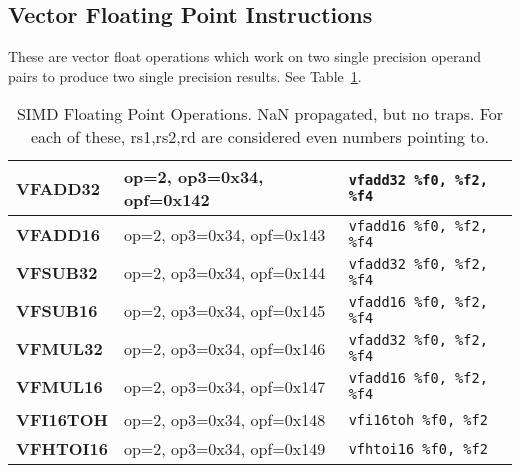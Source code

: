 \subsection{Vector Floating Point Instructions}
\label{sec:vector-floating-point-instructions}

These are vector  float operations which work on  two single precision
operand  pairs   to  produce   two  single  precision   results.   See
Table~\ref{tab:simd:float:ops}.

\begin{table}[p]
  \centering
  \begin{tabular}[p]{|l|l|l|}
    \hline
    \textbf{VFADD32}
    & {op=2, op3=0x34, opf=0x142}
    & \texttt{vfadd32 \%f0, \%f2, \%f4} \\
    \hline
    \textbf{VFADD16}
    & {op=2, op3=0x34, opf=0x143}
    & \texttt{vfadd16 \%f0, \%f2, \%f4} \\
    \hline
    \textbf{VFSUB32}
    & {op=2, op3=0x34, opf=0x144}
    & \texttt{vfadd32 \%f0, \%f2, \%f4} \\
    \hline
    \textbf{VFSUB16}
    & {op=2, op3=0x34, opf=0x145}
    & \texttt{vfadd16 \%f0, \%f2, \%f4} \\
    \hline
    \textbf{VFMUL32}
    & {op=2, op3=0x34, opf=0x146}
    & \texttt{vfadd32 \%f0, \%f2, \%f4} \\
    \hline
    \textbf{VFMUL16}
    & {op=2, op3=0x34, opf=0x147}
    & \texttt{vfadd16 \%f0, \%f2, \%f4} \\
    \hline
    \textbf{VFI16TOH}
    & {op=2, op3=0x34, opf=0x148}
    & \texttt{vfi16toh \%f0, \%f2} \\
    \hline
    \textbf{VFHTOI16}
    & {op=2, op3=0x34, opf=0x149}
    & \texttt{vfhtoi16 \%f0, \%f2} \\
    \hline      
  \end{tabular}
  \caption[SIMD Floating Point Operations]{SIMD Floating Point
    Operations.  NaN propagated, but no traps. For each of these,
    rs1,rs2,rd are considered even numbers pointing to.
  }
  \label{tab:simd:float:ops}
\end{table}


